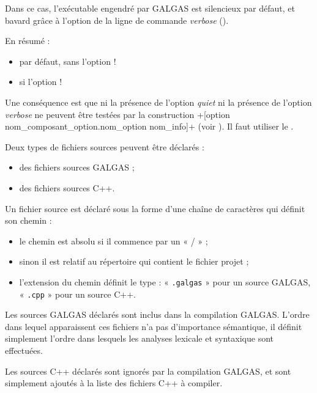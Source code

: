  Dans ce cas, l'exécutable engendré par GALGAS est silencieux par défaut, et bavard grâce à l'option de la ligne de commande \emph{verbose} ().

En résumé :
\begin{itemize}
\item par défaut, sans l'option \ggs!%
\item si l'option \ggs!%
\end{itemize}

Une conséquence est que ni la présence de l'option \emph{quiet} ni la présence de l'option \emph{verbose} ne peuvent être testées par la construction \ggs+[option nom_composant_option.nom_option nom_info]+ (voir ). Il faut utiliser le .








Deux types de fichiers sources peuvent être déclarés :
\begin{itemize}
  \item des fichiers sources GALGAS ;
  \item des fichiers sources C++.
\end{itemize}

Un fichier source est déclaré sous la forme d'une chaîne de caractères qui définit son chemin :
\begin{itemize}
\item le chemin est absolu si il commence par un « / » ;
\item sinon il est relatif au répertoire qui contient le fichier projet ;
\item l'extension du chemin définit le type : « \texttt{.galgas} » pour un source GALGAS, « \texttt{.cpp} » pour un source C++.
\end{itemize}

Les sources GALGAS déclarés sont inclus dans la compilation GALGAS. L'ordre dans lequel apparaissent ces fichiers n'a pas d'importance sémantique, il définit simplement l'ordre dans lesquels les analyses lexicale et syntaxique sont effectuées.

Les sources C++ déclarés sont ignorés par la compilation GALGAS, et sont simplement ajoutés à la liste des fichiers C++ à compiler.



